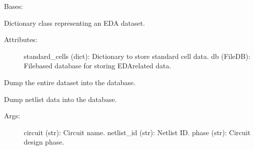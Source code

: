 \documentclass[letterpaper,10pt,english]{sphinxmanual}
\begin{document}
\begin{fulllineitems}
\label{\detokenize{eda_schema:eda_schema.dataset.Dataset}}
\pysigstartsignatures
{}
\pysigstopsignatures
\sphinxAtStartPar
Bases: 

\sphinxAtStartPar
Dictionary class representing an EDA dataset.
\begin{description}
\item[{Attributes:}] \leavevmode
\sphinxAtStartPar
standard\_cells (dict): Dictionary to store standard cell data.
db (FileDB): File\sphinxhyphen{}based database for storing EDA\sphinxhyphen{}related data.

\end{description}

\begin{fulllineitems}
\label{\detokenize{eda_schema:eda_schema.dataset.Dataset.dump_dataset}}
\pysigstartsignatures
{}
\pysigstopsignatures
\sphinxAtStartPar
Dump the entire dataset into the database.

\end{fulllineitems}


\begin{fulllineitems}
\label{\detokenize{eda_schema:eda_schema.dataset.Dataset.dump_netlist}}
\pysigstartsignatures
{}
\pysigstopsignatures
\sphinxAtStartPar
Dump netlist data into the database.
\begin{description}
\item[{Args:}] \leavevmode
\sphinxAtStartPar
circuit (str): Circuit name.
netlist\_id (str): Netlist ID.
phase (str): Circuit design phase.

\end{description}


\end{fulllineitems}
\end{fulllineitems}
\end{document}
